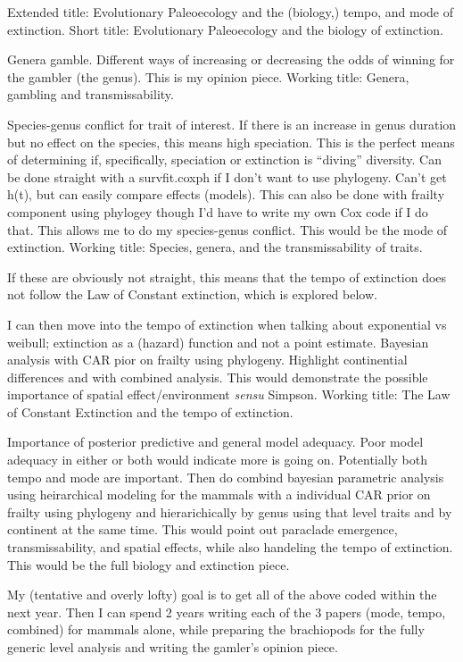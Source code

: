 \documentclass[12pt,letterpaper]{article}
\begin{document}
Extended title: Evolutionary Paleoecology and the (biology,) tempo, and mode of extinction.
Short title: Evolutionary Paleoecology and the biology of extinction.


Genera gamble. Different ways of increasing or decreasing the odds of winning for the gambler (the genus). This is my opinion piece. Working title: Genera, gambling and transmissability.

Species-genus conflict for trait of interest. If there is an increase in genus duration but no effect on the species, this means high speciation. This is the perfect means of determining if, specifically, speciation or extinction is ``diving'' diversity. Can be done straight with a survfit.coxph if I don't want to use phylogeny. Can't get h(t), but can easily compare effects (models). This can also be done with frailty component using phylogey though I'd have to write my own Cox code if I do that. This allows me to do my species-genus conflict. This would be the mode of extinction. Working title: Species, genera, and the transmissability of traits. 

If these are obviously not straight, this means that the tempo of extinction does not follow the Law of Constant extinction, which is explored below.

I can then move into the tempo of extinction when talking about exponential vs weibull; extinction as a (hazard) function and not a point estimate. Bayesian analysis with CAR pior on frailty using phylogeny. Highlight continential differences and with combined analysis. This would demonstrate the possible importance of spatial effect/environment \textit{sensu} Simpson. Working title: The Law of Constant Extinction and the tempo of extinction.

Importance of posterior predictive and general model adequacy. Poor model adequacy in either or both would indicate more is going on. Potentially both tempo and mode are important. Then do combind bayesian parametric analysis using heirarchical modeling for the mammals with a individual CAR prior on frailty using phylogeny and hierarichically by genus using that level traits and by continent at the same time. This would point out paraclade emergence, transmissability, and spatial effects, while also handeling the tempo of extinction. This would be the full biology and extinction piece.

My (tentative and overly lofty) goal is to get all of the above coded within the next year. Then I can spend 2 years writing each of the 3 papers (mode, tempo, combined) for mammals alone, while preparing the brachiopods for the fully generic level analysis and writing the gamler's opinion piece.
\end{document}
